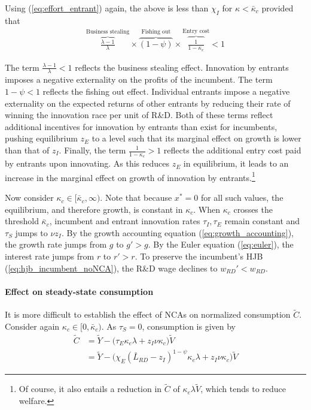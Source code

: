 \documentclass[12pt,english]{article}
\theoremstyle{remark}
\begin{document}
Using (\ref{eq:effort_entrant}) again, the above is less than $\chi_I$ for $\kappa < \bar{\kappa}_c$ provided that
\begin{align}
	\overbrace{\frac{\lambda-1}{\lambda}}^{\textrm{Business stealing}} \times \overbrace{(1-\psi)}^{\textrm{Fishing out}} \times  \overbrace{\frac{1}{1-\kappa_{e}}}^{\textrm{Entry cost}}< 1 \label{cs:growth_decreasing_condition}
\end{align}

The term $\frac{\lambda - 1}{\lambda} < 1$ reflects the business stealing effect. Innovation by entrants imposes a negative externality on the profits of the incumbent. The term $1-\psi < 1$ reflects the fishing out effect. Individual entrants impose a negative externality on the expected returns of other entrants by reducing their rate of winning the innovation race per unit of R\&D. Both of these terms reflect additional incentives for innovation by entrants than exist for incumbents, pushing equilibrium $z_E$ to a level such that its marginal effect on growth is lower than that of $z_I$. Finally, the term $\frac{1}{1-\kappa_e} > 1$ reflects the additional entry cost paid by entrants upon innovating. As this reduces $z_E$ in equilibrium, it leads to an increase in the marginal effect on growth of innovation by entrants.\footnote{Of course, it also entails a reduction in $\tilde{C}$ of $\kappa_e \lambda \tilde{V}$, which tends to reduce welfare.}

Now consider $\kappa_c \in [\bar{\kappa}_c,\infty)$. Note that because $x^* = 0$ for all such values, the equilibrium, and therefore growth, is constant in $\kappa_c$. When $\kappa_c$ crosses the threshold $\bar{\kappa}_c$, incumbent and entrant innovation rates $\tau_I,\tau_E$ remain constant and $\tau_S$ jumps to $\nu z_I$. By the growth accounting equation (\ref{eq:growth_accounting}), the growth rate jumps from $g$ to $g' > g$. By the Euler equation (\ref{eq:euler}), the interest rate jumps from $r$ to $r'>r$. To preserve the incumbent's HJB (\ref{eq:hjb_incumbent_noNCA}), the R\&D wage declines to $w_{RD}' < w_{RD}$.


\paragraph{Effect on steady-state consumption}

It is more difficult to establish the effect of NCAs on normalized consumption $\tilde{C}$. Consider again $\kappa_c \in [0, \bar{\kappa}_c)$. As $\tau_S = 0$, consumption is given by 
\begin{align*}
	\tilde{C} &= \tilde{Y} - \Big( \tau_E  \kappa_e \lambda + z_I \nu \kappa_c \Big) \tilde{V} \\
	  &= \tilde{Y} - \Big( \chi_E (\bar{L}_{RD} - z_I)^{1-\psi} \kappa_e \lambda + z_I \nu \kappa_c \Big) \tilde{V}
\end{align*}
\end{document}
